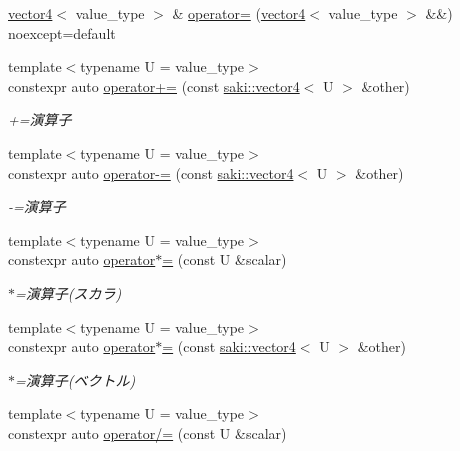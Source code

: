 \begin{DoxyCompactItemize}
\item 
\mbox{\hyperlink{classsaki_1_1vector4}{vector4}}$<$ value\+\_\+type $>$ \& \mbox{\hyperlink{classsaki_1_1vector4_a6e841a2c8d0467586902a4fc0fa6b9a4}{operator=}} (\mbox{\hyperlink{classsaki_1_1vector4}{vector4}}$<$ value\+\_\+type $>$ \&\&) noexcept=default
\item 
{\footnotesize template$<$typename U  = value\+\_\+type$>$ }\\constexpr auto \mbox{\hyperlink{classsaki_1_1vector4_a2109bee349eec6cba816718ecae33070}{operator+=}} (const \mbox{\hyperlink{classsaki_1_1vector4}{saki\+::vector4}}$<$ U $>$ \&other)
\begin{DoxyCompactList}\small\item\em +=演算子 \end{DoxyCompactList}\item 
{\footnotesize template$<$typename U  = value\+\_\+type$>$ }\\constexpr auto \mbox{\hyperlink{classsaki_1_1vector4_ab7b3e11c18b1a5bb5f3d8a029c6d8ccf}{operator-\/=}} (const \mbox{\hyperlink{classsaki_1_1vector4}{saki\+::vector4}}$<$ U $>$ \&other)
\begin{DoxyCompactList}\small\item\em -\/=演算子 \end{DoxyCompactList}\item 
{\footnotesize template$<$typename U  = value\+\_\+type$>$ }\\constexpr auto \mbox{\hyperlink{classsaki_1_1vector4_a49e953fdbce76c145389e6f2f7b09da0}{operator$\ast$=}} (const U \&scalar)
\begin{DoxyCompactList}\small\item\em $\ast$=演算子(スカラ) \end{DoxyCompactList}\item 
{\footnotesize template$<$typename U  = value\+\_\+type$>$ }\\constexpr auto \mbox{\hyperlink{classsaki_1_1vector4_acf5408d6463791999ce594ef19c438a4}{operator$\ast$=}} (const \mbox{\hyperlink{classsaki_1_1vector4}{saki\+::vector4}}$<$ U $>$ \&other)
\begin{DoxyCompactList}\small\item\em $\ast$=演算子(ベクトル) \end{DoxyCompactList}\item 
{\footnotesize template$<$typename U  = value\+\_\+type$>$ }\\constexpr auto \mbox{\hyperlink{classsaki_1_1vector4_af16bb700b952faa321775357a7926d8b}{operator/=}} (const U \&scalar)

\end{DoxyCompactItemize}
